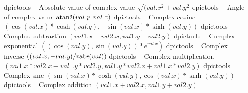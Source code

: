 %

%
  {dpictools}%
  {$\;\;$ Absolute value of complex value $\sqrt{(val.x^2+val.y^2}$}%
%
  {dpictools}%
  {$\;\;$ Angle of complex value $\hbox{atan2}(val.y, val.x)$}%
%
  {dpictools}%
  {$\;\;$ Complex cosine
    $(\cos(val.x)*\cosh(val.y), -\sin(val.x)*\sinh(val.y))$}%
%
  {dpictools}%
  {$\;\;$ Complex subtraction $(val1.x-val2.x, val1.y-val2.y)$}%
%
  {dpictools}%
  {$\;\;$ Complex exponential $((\cos(val.y), \sin(val.y))*e^{val.x})$}%
%
  {dpictools}%
  {$\;\;$ Complex inverse $((val.x, -val.y)/\hbox{zabs}(val))$}%
%
  {dpictools}%
  {$\;\;$ Complex multiplication
   $(val1.x*val2.x-val1.y*val2.y, val1.y*val2.x+val1.x*val2.y)$}%
%
  {dpictools}%
  {$\;\;$ Complex sine
   $(\sin(val.x)*\cosh(val.y), \cos(val.x)*\sinh(val.y))$}%
%
  {dpictools}%
  {$\;\;$ Complex addition $(val1.x+val2.x, val1.y+val2.y)$}%


